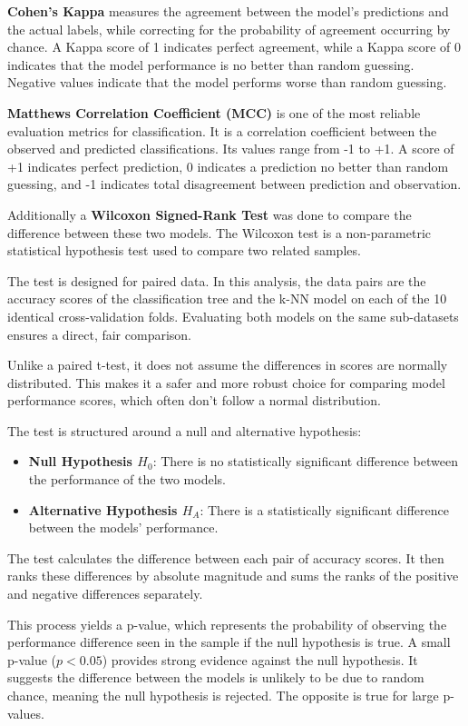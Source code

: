 \documentclass[conference]{IEEEtran}
\begin{document}
\textbf{Cohen's Kappa} measures the agreement between the model's predictions and the actual labels, while correcting for the probability of agreement occurring by chance. A Kappa score of 1 indicates perfect agreement, while a Kappa score of 0 indicates that the model performance is no better than random guessing. Negative values indicate that the model performs worse than random guessing.

\textbf{Matthews Correlation Coefficient (MCC)} is one of the most reliable evaluation metrics for classification. It is a correlation coefficient between the observed and predicted classifications. Its values range from -1 to +1. A score of +1 indicates perfect prediction, 0 indicates a prediction no better than random guessing, and -1 indicates total disagreement between prediction and observation.

Additionally a \textbf{Wilcoxon Signed-Rank Test} was done to compare the difference between these two models. The Wilcoxon test is a non-parametric statistical hypothesis test used to compare two related samples.

The test is designed for paired data. In this analysis, the data pairs are the accuracy scores of the classification tree and the k-NN model on each of the 10 identical cross-validation folds. Evaluating both models on the same sub-datasets ensures a direct, fair comparison.

Unlike a paired t-test, it does not assume the differences in scores are normally distributed. This makes it a safer and more robust choice for comparing model performance scores, which often don't follow a normal distribution.

The test is structured around a null and alternative hypothesis:

\begin{itemize}
    \item \textbf{Null Hypothesis $H_0$}: There is no statistically significant difference between the performance of the two models.
    \item \textbf{Alternative Hypothesis $H_A$}: There is a statistically significant difference between the models' performance.
\end{itemize}

The test calculates the difference between each pair of accuracy scores. It then ranks these differences by absolute magnitude and sums the ranks of the positive and negative differences separately.

This process yields a p-value, which represents the probability of observing the performance difference seen in the sample if the null hypothesis is true. A small p-value ($p < 0.05$) provides strong evidence against the null hypothesis. It suggests the difference between the models is unlikely to be due to random chance, meaning the null hypothesis is rejected. The opposite is true for large p-values.
\end{document}
